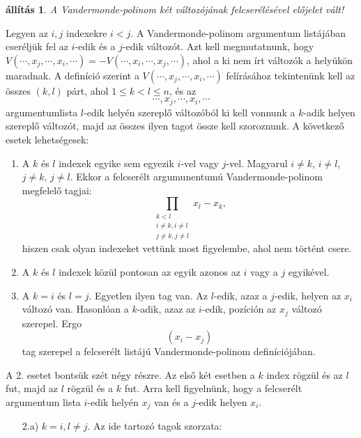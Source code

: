 \documentclass[a4paper, showtrims]{memoir}
\makeatletter
\renewenvironment{proof}[1][\proofname]
    {\par\pushQED{\qed}%
    \normalfont \topsep6\p@\@plus6\p@\relax
    \trivlist
    \item[\hskip\labelsep
        \itshape
    #1\@addpunct{:}]\ignorespaces}
    {\popQED\endtrivlist\@endpefalse}
\theoremstyle{plain}
\newtheorem{proposition}{állítás}[chapter]
\theoremstyle{remark}
\theoremstyle{definition}
\makeatother
\begin{document}
\begin{proposition}
    A Vandermonde-polinom két változójának felcserélésével előjelet vált!
\end{proposition}
\begin{proof}
    Legyen az $i,j$ indexekre $i<j$.
    A Vandermonde-polinom argumentum listájában cseréljük fel az $i$-edik és a $j$-edik változót.
    Azt kell megmutatnunk, hogy $V\left( \cdots,x_j,\cdots,x_i,\cdots \right)=-V\left( \cdots,x_i,\cdots,x_j,\cdots \right)$, ahol a ki nem írt változók a helyükön maradnak.
    A definíció szerint a $V\left( \cdots,x_j,\cdots,x_i,\cdots \right)$ felírásához tekintenünk kell az összes 
    $\left( k,l \right)$ párt, ahol $1\leq k<l\leq n$, és az 
    \[\cdots,x_j,\cdots,x_i,\cdots
    \]
    argumentumlista
    $l$-edik helyén szereplő változóból ki kell vonnunk a $k$-adik helyen szereplő változót, 
    majd az összes ilyen tagot össze kell szoroznunk.
    A következő esetek lehetségesek:
    \begin{enumerate}
        \item A $k$ és $l$ indexek egyike sem egyezik $i$-vel vagy $j$-vel.
            Magyarul $i\neq k$, $i\neq l$, $j\neq k$, $j\neq l$. 
            Ekkor a felcserélt argumunentumú Vandermonde-polinom megfelelő tagjai:
            \[
                \prod_{\substack{k<l\\i\neq k,i\neq l\\ j\neq k,j\neq l}}x_l-x_k,
            \]
            hiszen csak olyan indexeket vettünk most figyelembe, ahol nem történt csere.
        \item A $k$ és $l$ indexek közül pontosan az egyik azonos az $i$ vagy a $j$ egyikével.
        \item A $k=i$ és $l=j$.
            Egyetlen ilyen tag van. 
            Az $l$-edik, azaz a $j$-edik, helyen az $x_i$ változó van.
            Hasonlóan a $k$-adik, azaz az $i$-edik, pozíción az $x_j$ változó szerepel. 
            Ergo 
            \[
                \left( x_i-x_j \right)
            \]
            tag szerepel a felcserélt listájú Vandermonde-polinom definíciójában.
    \end{enumerate}
    A 2. esetet bontsük szét négy részre. 
    Az első két esetben a $k$ index rögzül és az $l$ fut,
    majd az $l$ rögzül és a $k$ fut.
    Arra kell figyelnünk, hogy a felcserélt argumentum lista $i$-edik helyén $x_j$ van és a $j$-edik helyen $x_i$.
    \begin{itemize}
        \item[2.a)]
            $k=i, l\neq j$. Az ide tartozó tagok szorzata:

\end{itemize}
\end{proof}
\end{document}
